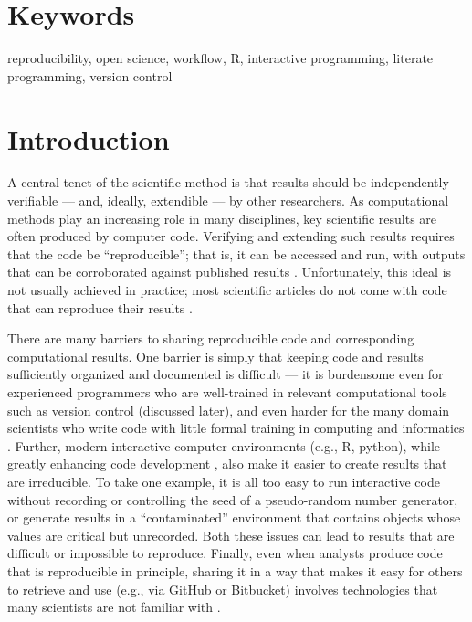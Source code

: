 \documentclass[9pt,a4paper]{extarticle}
\begin{document}
\section*{Keywords}

reproducibility, open science, workflow, R, interactive programming,
literate programming, version control

\clearpage

\pagestyle{main}


\section*{Introduction}

A central tenet of the scientific method is that results should be
independently verifiable --- and, ideally, extendible --- by other
researchers. As computational methods play an increasing role in many
disciplines, key scientific results are often produced by computer code.
Verifying and extending such results requires that the code be
``reproducible''; that is, it can be accessed and run, with outputs that
can be corroborated against published results \cite{Buckheit1995,
Gentleman2007, Peng2011, Ince2012, Morin2012, Sandve2013,
Easterbrook2014, Stodden2016, Lowndes2017}. Unfortunately, this ideal is
not usually achieved in practice; most scientific articles do not come
with code that can reproduce their results \cite{Ioannidis2009,
Ioannidis2014, Stodden2018}.

There are many barriers to sharing reproducible code and corresponding
computational results. One barrier is simply that keeping code and
results sufficiently organized and documented is difficult --- it is
burdensome even for experienced programmers who are well-trained in
relevant computational tools such as version control (discussed later),
and even harder for the many domain scientists who write code with
little formal training in computing and informatics \cite{Wilson2014}.
Further, modern interactive computer environments (e.g., R, python),
while greatly enhancing code development \cite{Findler2002}, also make
it easier to create results that are irreducible. To take one example,
it is all too easy to run interactive code without recording or
controlling the seed of a pseudo-random number generator, or generate
results in a ``contaminated'' environment that contains objects whose
values are critical but unrecorded. Both these issues can lead to
results that are difficult or impossible to reproduce. Finally, even
when analysts produce code that is reproducible in principle, sharing it
in a way that makes it easy for others to retrieve and use (e.g., via
GitHub or Bitbucket) involves technologies that many scientists are not
familiar with \cite{Marwick2017, Stodden2018}.
\end{document}
